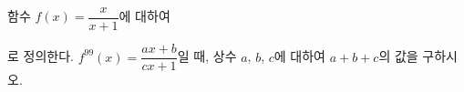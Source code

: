 함수 $f(x)=\dfrac{x}{x+1}$에 대하여 \par\smallskip{}\par\smallskip\noindent 로 정의한다. $f^{99}(x)=\dfrac{ax+b}{cx+1}$일 때, 상수 $a$, $b$, $c$에 대하여 $a+b+c$의 값을 구하시오.
